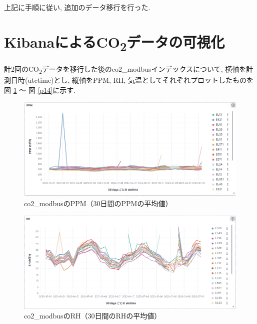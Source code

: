 上記に手順に従い, 追加のデータ移行を行った.

\section{KibanaによるCO\textsubscript{2}データの可視化}

計2回のCO\textsubscript{2}データを移行した後のco2\_modbusインデックスについて, 横軸を計測日時(utctime)とし, 縦軸をPPM, RH, 気温としてそれぞれプロットしたものを図 \ref{p12} 〜 図 \ref{p14}に示す.

\begin{figure}[H]
  \begin{center}
    \includegraphics[width=140mm]{sotu/figure/ppm.png}
    \caption{co2\_modbusのPPM（30日間のPPMの平均値）}
    \label{p12}
  \end{center}
\end{figure}

\begin{figure}[H]
  \begin{center}
    \includegraphics[width=140mm]{sotu/figure/rh.png}
    \caption{co2\_modbusのRH（30日間のRHの平均値）}
    \label{p13}
  \end{center}
\end{figure}

